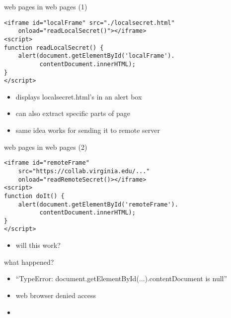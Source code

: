 
\begin{frame}[fragile,label=webInWeb]{web pages in web pages (1)}
    \vspace{-.25cm}
\begin{verbatim}
<iframe id="localFrame" src="./localsecret.html"
    onload="readLocalSecret()"></iframe>
<script>
function readLocalSecret() {
    alert(document.getElementById('localFrame').
          contentDocument.innerHTML);
}
</script>
\end{verbatim}
    \begin{itemize}
    \vspace{-.25cm}
    \item displays localsecret.html's  in an alert box
    \item can also extract specific parts of page
    \item same idea works for sending it to remote server
    \end{itemize}
\end{frame}

\begin{frame}[fragile,label=webInWebOther]{web pages in web pages (2)}
    \vspace{-.25cm}
    \setlength{\parskip}{-0.5\baselineskip}
\begin{verbatim}
<iframe id="remoteFrame"
    src="https://collab.virginia.edu/..."
    onload="readRemoteSecret()></iframe>
<script>
function doIt() {
    alert(document.getElementById('remoteFrame').
          contentDocument.innerHTML);
}
</script>
\end{verbatim}
    \begin{itemize}
    \item will this work?
    \end{itemize}
\end{frame}

\begin{frame}{what happened?}
    \begin{itemize}
        \item ``TypeError: document.getElementById(...).contentDocument is null''
        \item web browser denied access
        \vspace{.5cm}
    \item {}
    \end{itemize}
\end{frame}


